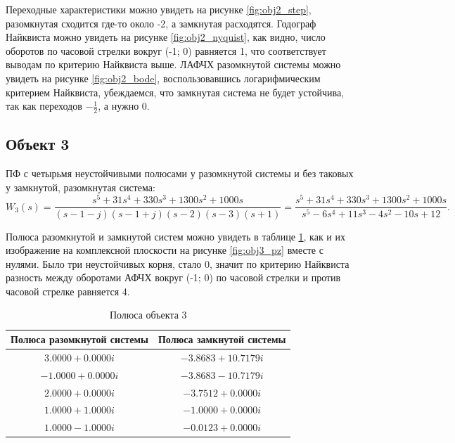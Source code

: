 Переходные характеристики можно увидеть на рисунке \ref{fig:obj2_step},
разомкнутая сходится где-то около -2, а замкнутая расходятся. 
Годограф Найквиста можно увидеть на рисунке 
\ref{fig:obj2_nyquist}, как видно, число оборотов по часовой стрелки
вокруг (-1; 0) равняется 1, что соответствует выводам по критерию Найквиста
выше. ЛАФЧХ разомкнутой системы можно увидеть на рисунке \ref{fig:obj2_bode},
воспользовавшись логарифмическим критерием Найквиста, убеждаемся, что 
замкнутая система не будет устойчива, так как переходов $-\frac{1}{2}$, а нужно $0$.


\newpage
\subsection{Объект 3}

ПФ с четырьмя неустойчивыми полюсами у разомкнутой системы и без таковых у замкнутой,
разомкнутая система:
\begin{equation*}
    W_3(s)=\frac{s^5+31s^4+330s^3+1300s^2+1000s}{(s-1-j)(s-1+j)(s-2)(s-3)(s+1)}
    = \frac{s^5+31s^4+330s^3+1300s^2+1000s}{s^5-6s^4+11s^3-4s^2-10s+12}.
\end{equation*}

Полюса разомкнутой и замкнутой систем можно увидеть в таблице \ref{tab:poles3},
как и их изображение на комплексной плоскости на рисунке \ref{fig:obj3_pz}
вместе с нулями. Было три неустойчивых корня, стало 0, значит по критерию 
Найквиста разность между оборотами АФЧХ вокруг (-1; 0) по часовой стрелки и против часовой стрелке
равняется 4.

\begin{table}[H]
    \centering
    \caption{Полюса объекта 3}
    \begin{tabular}{|c|c|}
    \hline
    \textbf{Полюса разомкнутой системы}       & \textbf{Полюса замкнутой системы}        \\ \hline
        $3.0000 + 0.0000i$ & $-3.8683 + 10.7179i$ \\ \hline
        $-1.0000 + 0.0000i$ & $-3.8683 - 10.7179i$ \\ \hline
        $2.0000 + 0.0000i$ & $-3.7512 + 0.0000i$ \\ \hline
        $1.0000 + 1.0000i$ & $-1.0000 + 0.0000i$ \\ \hline
        $1.0000 - 1.0000i$ & $-0.0123 + 0.0000i$ \\ \hline
    \end{tabular}
    \label{tab:poles3}
\end{table}

